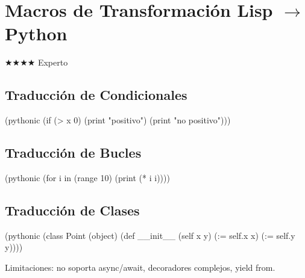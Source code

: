 \chapter{Macros de Transformación Lisp $\to$ Python}
\label{chap:transformation-macros}
{\huge$\bigstar$}{\huge$\bigstar$}{\huge$\bigstar$}{\huge$\bigstar$} Experto

\section{Traducción de Condicionales}
\begin{lispcode}
(pythonic (if (> x 0) (print "positivo") (print "no positivo")))
\end{lispcode}

\section{Traducción de Bucles}
\begin{lispcode}
(pythonic (for i in (range 10) (print (* i i))))
\end{lispcode}

\section{Traducción de Clases}
\begin{lispcode}
(pythonic (class Point (object)
            (def __init__ (self x y) (:= self.x x) (:= self.y y))))
\end{lispcode}

Limitaciones: no soporta async/await, decoradores complejos, yield from.

